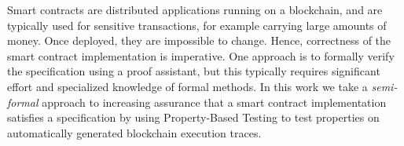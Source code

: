 \documentclass[twoside,11pt,openright]{report}
\newcommand{\pbt}{Property-Based Testing}
\begin{document}




Smart contracts are distributed applications running on a blockchain, and are typically used for sensitive transactions, for example carrying
large amounts of money. Once deployed, they are impossible to change. Hence, correctness of the smart contract implementation is imperative. One approach is to formally verify the specification using a proof assistant, but this typically requires significant effort and specialized knowledge of formal methods. In this work we take a \textit{semi-formal} approach to increasing assurance that a smart contract implementation satisfies a specification by using Property-Based Testing to test properties on automatically generated blockchain execution traces.
\end{document}

